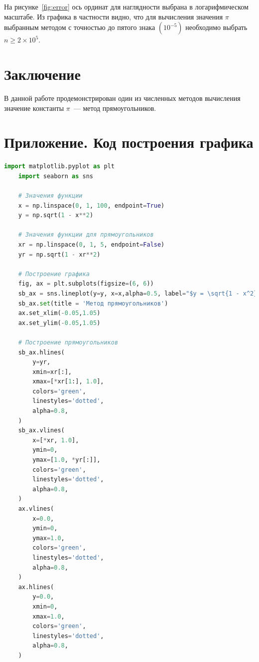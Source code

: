 \documentclass[a4paper,12pt]{article}
\begin{document}
На рисунке~\ref{fig:error} ось ординат для наглядности выбрана в логарифмическом масштабе. Из графика в частности видно, что для вычисления значения $\pi$ выбранным методом с точностью до пятого знака $(10^{-5})$ необходимо выбрать $ n \ge 2\times10^5$.

\section{Заключение}

В данной работе продемонстрирован один из численных методов вычисления значение константы $\pi$~--- метод прямоугольников.

\pagebreak

\section{Приложение. Код построения графика}

\begin{lstlisting}[language=Python, caption=Код построения рис.\ref{left_rect}]
    import matplotlib.pyplot as plt
    import seaborn as sns

    # Значения функции
    x = np.linspace(0, 1, 100, endpoint=True)
    y = np.sqrt(1 - x**2)

    # Значения функции для прямоугольников
    xr = np.linspace(0, 1, 5, endpoint=False)
    yr = np.sqrt(1 - xr**2)

    # Построение графика
    fig, ax = plt.subplots(figsize=(6, 6))
    sb_ax = sns.lineplot(y=y, x=x,alpha=0.5, label="$y = \sqrt{1 - x^2}$")
    sb_ax.set(title = 'Метод прямоугольников')
    ax.set_xlim(-0.05,1.05)
    ax.set_ylim(-0.05,1.05)

    # Построение прямоугольников
    sb_ax.hlines(
        y=yr,
        xmin=xr[:],
        xmax=[*xr[1:], 1.0],
        colors='green',
        linestyles='dotted',
        alpha=0.8,
    )
    sb_ax.vlines(
        x=[*xr, 1.0],
        ymin=0,
        ymax=[1.0, *yr[:]],
        colors='green',
        linestyles='dotted',
        alpha=0.8,
    )
    ax.vlines(
        x=0.0,
        ymin=0,
        ymax=1.0,
        colors='green',
        linestyles='dotted',
        alpha=0.8,
    )
    ax.hlines(
        y=0.0,
        xmin=0,
        xmax=1.0,
        colors='green',
        linestyles='dotted',
        alpha=0.8,
    )    
\end{lstlisting}

\end{document}
